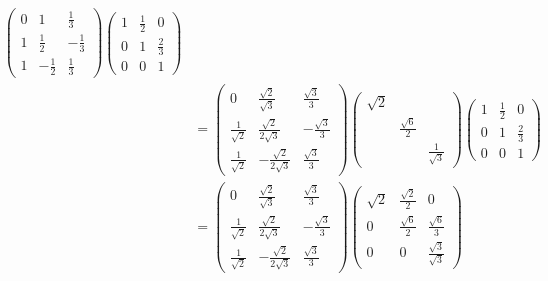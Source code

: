 \documentclass[12pt, a4paper, oneside, UTF8]{ctexbook}
\begin{document}
\begin{solution}
\begin{enumerate}[label=(\arabic*)]
\begin{align*}
\begin{pmatrix}
                0& 1 & \frac{1}{3}\\
                1& \frac{1}{2}& -\frac{1}{3} \\
                1 & -\frac{1}{2} & \frac{1}{3}
            \end{pmatrix} 
            \begin{pmatrix}
                1 &\frac{1}{2}&0\\
                0 & 1&\frac{2}{3} \\
                0&0&1
            \end{pmatrix}\\
            &=\begin{pmatrix}
                0& \frac{\sqrt{2}}{\sqrt{3}} & \frac{\sqrt{3}}{3}\\
                \frac{1}{\sqrt{2}}& \frac{\sqrt{2}}{2\sqrt{3}}& -\frac{\sqrt{3}}{3} \\
                \frac{1}{\sqrt{2}} & -\frac{\sqrt{2}}{2\sqrt{3}}& \frac{\sqrt{3}}{3}
            \end{pmatrix}
            \begin{pmatrix}
                \sqrt{2} & & \\
                & \frac{\sqrt{6}}{2}& \\
                & & \frac{1}{\sqrt{3}}
            \end{pmatrix}
            \begin{pmatrix}
                1 &\frac{1}{2}&0\\
                0 & 1&\frac{2}{3} \\
                0&0&1
            \end{pmatrix}\\
            &=\begin{pmatrix}
                0& \frac{\sqrt{2}}{\sqrt{3}} & \frac{\sqrt{3}}{3}\\
                \frac{1}{\sqrt{2}}& \frac{\sqrt{2}}{2\sqrt{3}}& -\frac{\sqrt{3}}{3} \\
                \frac{1}{\sqrt{2}} & -\frac{\sqrt{2}}{2\sqrt{3}}& \frac{\sqrt{3}}{3}
            \end{pmatrix}
            \begin{pmatrix}
                \sqrt{2} &\frac{\sqrt{2}}{2}&0\\
                0 & \frac{\sqrt{6}}{2}&\frac{\sqrt{6}}{3} \\
                0&0&\frac{\sqrt{3}}{\sqrt{3}}
            \end{pmatrix}
        \end{align*}

\end{enumerate}
\end{solution}
\end{document}
